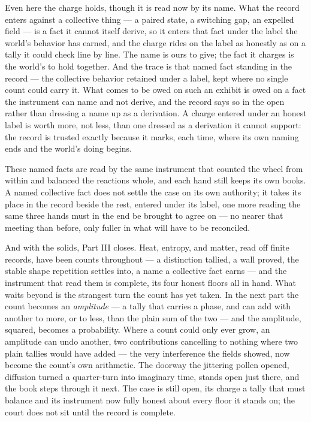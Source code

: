 Even here the charge holds, though it is read now by its name. What the record enters against a collective
thing --- a paired state, a switching gap, an expelled field --- is a fact it cannot itself derive, so it enters
that fact under the label the world's behavior has earned, and the charge rides on the label as honestly as on a
tally it could check line by line. The name is ours to give; the fact it charges is the world's to hold
together. And the trace is that named fact standing in the record --- the collective behavior retained under a
label, kept where no single count could carry it. What comes to be owed on such an exhibit is owed on a fact the
instrument can name and not derive, and the record says so in the open rather than dressing a name up as a
derivation. A charge entered under an honest label is worth more, not less, than one dressed as a derivation it
cannot support: the record is trusted exactly because it marks, each time, where its own naming ends and the
world's doing begins.

These named facts are read by the same instrument that counted the wheel from within and balanced the reactions
whole, and each hand still keeps its own books. A named collective fact does not settle the case on its own
authority; it takes its place in the record beside the rest, entered under its label, one more reading the same
three hands must in the end be brought to agree on --- no nearer that meeting than before, only fuller in what
will have to be reconciled.

And with the solids, Part III closes. Heat, entropy, and matter, read off finite records, have been counts
throughout --- a distinction tallied, a wall proved, the stable shape repetition settles into, a name a
collective fact earns --- and the instrument that read them is complete, its four honest floors all in hand.
What waits beyond is the strangest turn the count has yet taken. In the next part the count becomes an
\emph{amplitude} --- a tally that carries a phase, and can add with another to more, or to less, than the plain
sum of the two --- and the amplitude, squared, becomes a probability. Where a count could only ever grow, an
amplitude can undo another, two contributions cancelling to nothing where two plain tallies would have added ---
the very interference the fields showed, now become the count's own arithmetic. The doorway the jittering pollen
opened, diffusion turned a quarter-turn into imaginary time, stands open just there, and the book steps through
it next.
The case is still open, its charge a tally that must balance and its instrument now fully honest about every
floor it stands on; the court does not sit until the record is complete.


